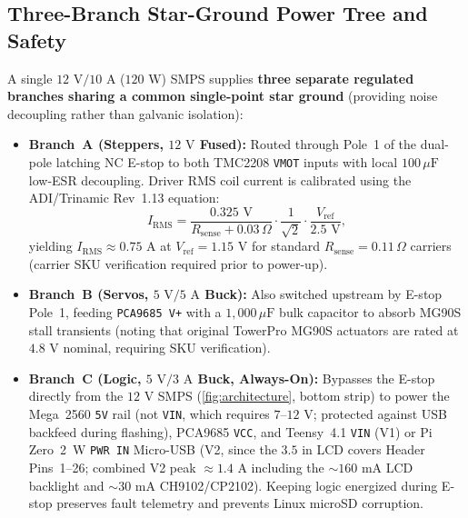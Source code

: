 \documentclass[10pt,twocolumn,letterpaper]{article}
\begin{document}
\subsection{Three-Branch Star-Ground Power Tree and Safety}
A single $12\text{ V}/10\text{ A}$ ($120\text{ W}$) SMPS supplies \textbf{three separate regulated branches sharing a common single-point star ground} (providing noise decoupling rather than galvanic isolation):
\begin{itemize}
  \item \textbf{Branch~A (Steppers, $12\text{ V}$ Fused):} Routed through Pole~1 of the dual-pole latching NC E-stop to both TMC2208 \texttt{VMOT} inputs with local $100\,\mu\text{F}$ low-ESR decoupling. Driver RMS coil current is calibrated using the ADI/Trinamic Rev~1.13 equation:
  \begin{equation}
    I_{\mathrm{RMS}} = \frac{0.325\text{ V}}{R_{\mathrm{sense}} + 0.03\,\Omega} \cdot \frac{1}{\sqrt{2}} \cdot \frac{V_{\mathrm{ref}}}{2.5\text{ V}},
    \label{eq:tmc_irms}
  \end{equation}
  yielding $I_{\mathrm{RMS}} \approx 0.75\text{ A}$ at $V_{\mathrm{ref}} = 1.15\text{ V}$ for standard $R_{\mathrm{sense}} = 0.11\,\Omega$ carriers (carrier SKU verification required prior to power-up).
  \item \textbf{Branch~B (Servos, $5\text{ V}/5\text{ A}$ Buck):} Also switched upstream by E-stop Pole~1, feeding \texttt{PCA9685 V+} with a $1{,}000\,\mu\text{F}$ bulk capacitor to absorb MG90S stall transients (noting that original TowerPro MG90S actuators are rated at $4.8\text{ V}$ nominal, requiring SKU verification).
  \item \textbf{Branch~C (Logic, $5\text{ V}/3\text{ A}$ Buck, Always-On):} Bypasses the E-stop directly from the $12\text{ V}$ SMPS (\cref{fig:architecture}, bottom strip) to power the Mega~2560 \texttt{5V} rail (not \texttt{VIN}, which requires $7\text{--}12\text{ V}$; protected against USB backfeed during flashing), PCA9685 \texttt{VCC}, and Teensy~4.1 \texttt{VIN} (V1) or Pi Zero~2~W \texttt{PWR IN} Micro-USB (V2, since the $3.5\text{ in}$ LCD covers Header Pins~1--26; combined V2 peak $\approx 1.4\text{ A}$ including the $\sim 160\text{ mA}$ LCD backlight and $\sim 30\text{ mA}$ CH9102/CP2102). Keeping logic energized during E-stop preserves fault telemetry and prevents Linux microSD corruption.
\end{itemize}
\end{document}
